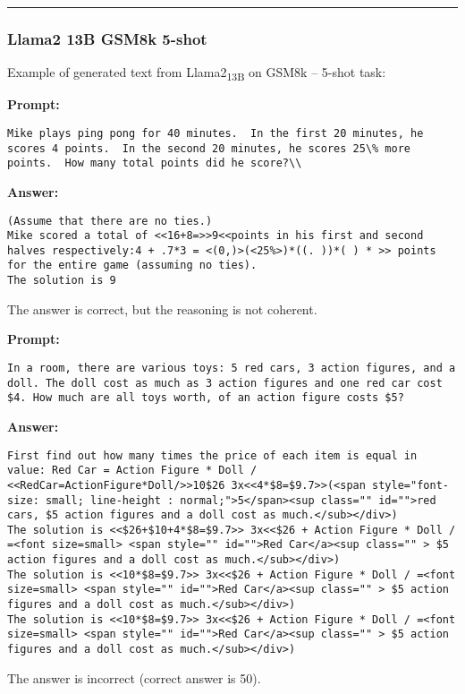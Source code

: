 	\noindent\rule{\textwidth}{0.4pt}

	\subsubsection*{Llama2 13B GSM8k 5-shot}
	\noindent Example of generated text from Llama2\textsubscript{13B} on GSM8k -- 5-shot task:
	\begin{displayquote}
		\textbf{Prompt:}
		\begin{Verbatim}[fontsize=\small,breaklines]
Mike plays ping pong for 40 minutes.  In the first 20 minutes, he scores 4 points.  In the second 20 minutes, he scores 25\% more points.  How many total points did he score?\\
	\end{Verbatim}
		\textbf{Answer:}
		\begin{Verbatim}[fontsize=\small,breaklines]
(Assume that there are no ties.)
Mike scored a total of <<16+8=>>9<<points in his first and second halves respectively:4 + .7*3 = <(0,)>(<25%>)*((. ))*( ) * >> points for the entire game (assuming no ties).
The solution is 9
	\end{Verbatim}
	\end{displayquote}
	The answer is correct, but the reasoning is not coherent.
	\begin{displayquote}
		\textbf{Prompt:}
		\begin{Verbatim}[fontsize=\small,breaklines]
In a room, there are various toys: 5 red cars, 3 action figures, and a doll. The doll cost as much as 3 action figures and one red car cost $4. How much are all toys worth, of an action figure costs $5?
	\end{Verbatim}

		\textbf{Answer:}
		\begin{Verbatim}[fontsize=\small,breaklines]
First find out how many times the price of each item is equal in value: Red Car = Action Figure * Doll / <<RedCar=ActionFigure*Doll/>>10$26 3x<<4*$8=$9.7>>(<span style="font-size: small; line-height : normal;">5</span><sup class="" id="">red cars, $5 action figures and a doll cost as much.</sub></div>)
The solution is <<$26+$10+4*$8=$9.7>> 3x<<$26 + Action Figure * Doll / =<font size=small> <span style="" id="">Red Car</a><sup class="" > $5 action figures and a doll cost as much.</sub></div>)
The solution is <<10*$8=$9.7>> 3x<<$26 + Action Figure * Doll / =<font size=small> <span style="" id="">Red Car</a><sup class="" > $5 action figures and a doll cost as much.</sub></div>)
The solution is <<10*$8=$9.7>> 3x<<$26 + Action Figure * Doll / =<font size=small> <span style="" id="">Red Car</a><sup class="" > $5 action figures and a doll cost as much.</sub></div>)
	\end{Verbatim}
	\end{displayquote}
	The answer is incorrect (correct answer is 50).

